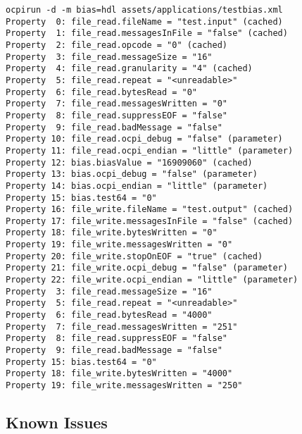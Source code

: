 \begin{lstlisting}
ocpirun -d -m bias=hdl assets/applications/testbias.xml
Property  0: file_read.fileName = "test.input" (cached)
Property  1: file_read.messagesInFile = "false" (cached)
Property  2: file_read.opcode = "0" (cached)
Property  3: file_read.messageSize = "16"
Property  4: file_read.granularity = "4" (cached)
Property  5: file_read.repeat = "<unreadable>"
Property  6: file_read.bytesRead = "0"
Property  7: file_read.messagesWritten = "0"
Property  8: file_read.suppressEOF = "false"
Property  9: file_read.badMessage = "false"
Property 10: file_read.ocpi_debug = "false" (parameter)
Property 11: file_read.ocpi_endian = "little" (parameter)
Property 12: bias.biasValue = "16909060" (cached)
Property 13: bias.ocpi_debug = "false" (parameter)
Property 14: bias.ocpi_endian = "little" (parameter)
Property 15: bias.test64 = "0"
Property 16: file_write.fileName = "test.output" (cached)
Property 17: file_write.messagesInFile = "false" (cached)
Property 18: file_write.bytesWritten = "0"
Property 19: file_write.messagesWritten = "0"
Property 20: file_write.stopOnEOF = "true" (cached)
Property 21: file_write.ocpi_debug = "false" (parameter)
Property 22: file_write.ocpi_endian = "little" (parameter)
Property  3: file_read.messageSize = "16"
Property  5: file_read.repeat = "<unreadable>"
Property  6: file_read.bytesRead = "4000"
Property  7: file_read.messagesWritten = "251"
Property  8: file_read.suppressEOF = "false"
Property  9: file_read.badMessage = "false"
Property 15: bias.test64 = "0"
Property 18: file_write.bytesWritten = "4000"
Property 19: file_write.messagesWritten = "250"
\end{lstlisting}

\subsection*{Known Issues}
